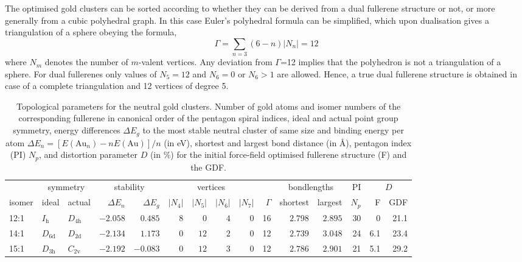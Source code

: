 The optimised gold clusters can be sorted according to whether they can be
derived from a dual fullerene structure or not, or more generally from a cubic
polyhedral graph. In this case Euler's polyhedral formula can be simplified,
which upon dualisation gives a triangulation of a sphere obeying the formula,
%
\begin{equation}
\label{eq3valent} 
\Gamma=\sum_{n=3}(6-n)|N_n| = 12
\end{equation}
%
where $N_m$ denotes the number of $m$-valent vertices. Any deviation from
$\Gamma$=12 implies that the polyhedron is not a triangulation of a sphere. For
dual fullerenes only values of $N_5=12$ and $N_6=0$ or $N_6>1$ are allowed.
Hence, a true dual fullerene structure is obtained in case of a complete
triangulation and 12 vertices of degree 5.
%
\begin{table}[htbp]
	\centering
    \setlength{\tabcolsep}{1.5pt}
    \footnotesize{
    \caption{Topological parameters for the neutral gold clusters. Number of
    gold atoms and isomer numbers of the corresponding fullerene in canonical
    order of the pentagon spiral indices,\autocite{Fowler-atlas-2006} ideal and
    actual point group symmetry, energy differences $\Delta E_g$ to the most
    stable neutral cluster of same size and binding energy per atom $\Delta E_n
    = [E(\textrm{Au}_n)-nE(\textrm{Au})]/n$  (in eV), shortest and largest bond
    distance (in \AA), pentagon index (PI) $N_p$, and distortion parameter $D$
    (in \%) for the initial force-field optimised fullerene structure (F) and
    the \acs{GDF}.}
	\label{tab:neutral}
	\begin{tabular}{lllrrrrrrrrrrrr}
\toprule
\multicolumn{1}{c}{  } & \multicolumn{2}{c}{ symmetry  }  & \multicolumn{2}{c}{stability} & \multicolumn{4}{c}{ vertices } & & \multicolumn{2}{c}{ bondlengths } &  PI & \multicolumn{2}{c}{ $D$ } \\
isomer & ideal  & actual  & $\Delta E_n$ &$\Delta E_g$ & \multicolumn{1}{c}{$|N_4|$} & \multicolumn{1}{c}{$|N_5|$} & \multicolumn{1}{c}{$|N_6|$} & \multicolumn{1}{c}{$|N_7|$} & $\Gamma$ & shortest & largest  & $N_p$ & F & GDF\\\midrule
12:1    & $I_\mathrm{h}$  & $D_\mathrm{4h}$ & $-2.058$ & $0.485$  & $8$ & $0$  & $4$      & $0$ & 16  & $2.798$ & $2.895$ & 30  & 0    & 21.1  \\
14:1    & $D_\mathrm{6d}$ & $D_\mathrm{2d}$ & $-2.134$ & $1.173$  & $0$ & $12$ & $2$      & $0$ & 12  & $2.739$ & $3.048$ & 24  & 6.1  & 23.4  \\
15:1    & $D_\mathrm{3h}$ & $C_\mathrm{2v}$ & $-2.192$ & $-0.083$ & $0$ & $12$ & $3$      & $0$ & 12  & $2.786$ & $2.901$ & 21  & 5.1  & 29.2  \\

\end{tabular}}
\end{table}
